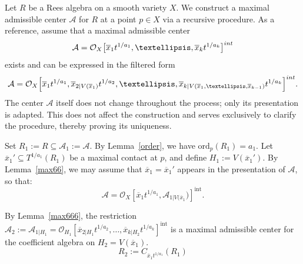 \documentclass{amsart}
\begin{document}
Let \(R\) be a Rees algebra on a smooth variety \(X\). We construct a maximal admissible center \(\mathcal A\) for \(R\) at a point \(p \in X\) via a recursive procedure. As a reference, assume that a maximal admissible center 
\[
\mathcal A = \mathcal O_X\big[\overline x_1 t^{1/a_1}, \dots, \overline x_k t^{1/a_k}\big]^{\rm int}
\]
exists and can be expressed in the filtered form
\[
\mathcal A = \mathcal O_X\Big[ \overline x_1 t^{1/a_1}, \overline x_{2|V(\overline x_1)} t^{1/a_2}, \dots, \overline x_{k|V(\overline x_1, \dots, \overline x_{k-1})} t^{1/a_k} \Big]^{\rm int}.
\]
The center \(\mathcal A\) itself does not change throughout the process; only its presentation is adapted. This does not affect the construction and serves exclusively to clarify the procedure, thereby proving its uniqueness.

Set \( R_1 := R \subseteq \mathcal{A}_1 := \mathcal{A} \). By Lemma~\ref{order}, we have \( \mathrm{ord}_p(R_1) = a_1 \). Let \( \overline{x}_1' \subseteq T^{1/a_1}(R_1) \) be a maximal contact at \( p \), and define \( H_1 := V(\overline{x}_1') \). By Lemma~\ref{max66}, we may assume that \( \overline{x}_1 = \overline{x}_1' \) appears in the presentation of \( \mathcal{A} \), so that:
\[
\mathcal{A} = \mathcal{O}_X\left[\overline{x}_1 t^{1/a_1}, \mathcal{A}_{1|V(\overline{x}_1})\right]^{\mathrm{int}}.
\]

By Lemma~\ref{max666}, the restriction \( \mathcal{A}_2 := \mathcal{A}_{1|H_1}= \mathcal{O}_{H_1}\left[\overline{x}_{2|H_1} t^{1/a_2}, \ldots, \overline{x}_{k|H_2} t^{1/a_k}\right]^{\mathrm{int}} \) is a maximal admissible center for the coefficient algebra on $H_2=V(\overline{x}_1)$.
\[
R_2 := C_{\overline{x}_1 t^{1/a_1}}(R_1)
\]
\end{document}
